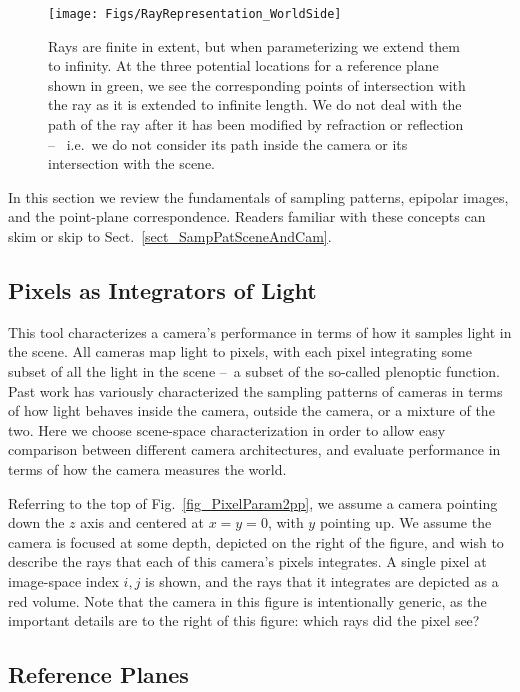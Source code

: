\documentclass[onecolumn]{article}
\begin{document}
\begin{figure}
	\centering
	\texttt{[image: Figs/RayRepresentation\_WorldSide]}
	\caption{Rays are finite in extent, but when parameterizing we extend them to infinity.  At the three potential locations for a reference plane shown in green, we see the corresponding points of intersection with the ray as it is extended to infinite length.  We do not deal with the path of the ray after it has been modified by refraction or reflection --~ i.e.~we do not consider its path inside the camera or its intersection with the scene.}
	\label{fig_RayRepWorldSide}
\end{figure}

In this section we review the fundamentals of sampling patterns, epipolar images, and the point-plane correspondence.  Readers familiar with these concepts can skim or skip to Sect.~\ref{sect_SampPatSceneAndCam}.

\subsection{Pixels as Integrators of Light}

This tool characterizes a camera's performance in terms of how it samples light in the scene.  All cameras map light to pixels, with each pixel integrating some subset of all the light in the scene --~a subset of the so-called plenoptic function.  Past work has variously characterized the sampling patterns of cameras in terms of how light behaves inside the camera, outside the camera, or a mixture of the two.  Here we choose scene-space characterization in order to allow easy comparison between different camera architectures, and evaluate performance in terms of how the camera measures the world.

Referring to the top of Fig.~\ref{fig_PixelParam2pp}, we assume a camera pointing down the $z$ axis and centered at $x=y=0$, with $y$ pointing up.  We assume the camera is focused at some depth, depicted on the right of the figure, and wish to describe the rays that each of this camera's pixels integrates.  A single pixel at image-space index $i,j$ is shown, and the rays that it integrates are depicted as a red volume.  Note that the camera in this figure is intentionally generic, as the important details are to the right of this figure: which rays did the pixel see?

\subsection{Reference Planes}
\end{document}
